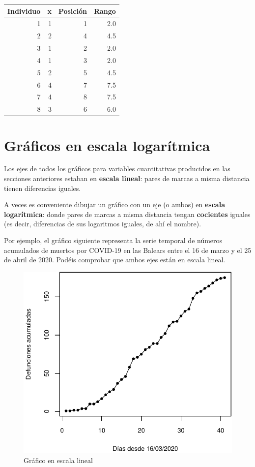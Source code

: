 \documentclass[
]{book}
\theoremstyle{definition}
\theoremstyle{definition}
\theoremstyle{definition}
\theoremstyle{definition}
\theoremstyle{remark}
\begin{document}
\begin{table}
\centering
\begin{tabular}{r|r|r|r}
\hline
Individuo & x & Posición & Rango\\
\hline
1 & 1 & 1 & 2.0\\
\hline
2 & 2 & 4 & 4.5\\
\hline
3 & 1 & 2 & 2.0\\
\hline
4 & 1 & 3 & 2.0\\
\hline
5 & 2 & 5 & 4.5\\
\hline
6 & 4 & 7 & 7.5\\
\hline
7 & 4 & 8 & 7.5\\
\hline
8 & 3 & 6 & 6.0\\
\hline
\end{tabular}
\end{table}

\hypertarget{gruxe1ficos-en-escala-logaruxedtmica}{%
\section{Gráficos en escala logarítmica}\label{gruxe1ficos-en-escala-logaruxedtmica}}

Los ejes de todos los gráficos para variables cuantitativas producidos en las secciones anteriores estaban en \textbf{escala lineal}: pares de marcas a misma distancia tienen diferencias iguales.

A veces es conveniente dibujar un gráfico con un eje (o ambos) en \textbf{escala logarítmica}: donde pares de marcas a misma distancia tengan \textbf{cocientes} iguales (es decir, diferencias de sus logaritmos iguales, de ahí el nombre).

Por ejemplo, el gráfico siguiente representa la serie temporal de números acumulados de muertos por COVID-19 en las Balears entre el 16 de marzo y el 25 de abril de 2020. Podéis comprobar que ambos ejes están en escala lineal.

\begin{figure}

{\centering \includegraphics[width=0.5\linewidth]{INREMDN_files/figure-latex/unnamed-chunk-325-1} 

}

\caption{Gráfico en escala lineal}\label{fig:unnamed-chunk-325}
\end{figure}
\end{document}

